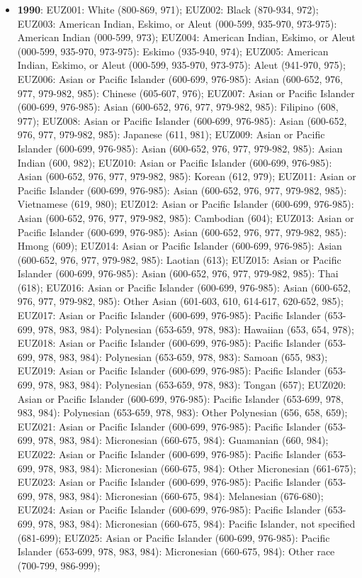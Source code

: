 \documentclass[a4paper]{article}
\begin{document}
\begin{itemize}
   \item{\textbf{1990}:  EUZ001: White (800-869, 971); EUZ002: Black (870-934, 972); EUZ003: American Indian, Eskimo, or Aleut (000-599, 935-970, 973-975): American Indian (000-599, 973); EUZ004: American Indian, Eskimo, or Aleut (000-599, 935-970, 973-975): Eskimo (935-940, 974); EUZ005: American Indian, Eskimo, or Aleut (000-599, 935-970, 973-975): Aleut (941-970, 975); EUZ006: Asian or Pacific Islander (600-699, 976-985): Asian (600-652, 976, 977, 979-982, 985): Chinese (605-607, 976); EUZ007: Asian or Pacific Islander (600-699, 976-985): Asian (600-652, 976, 977, 979-982, 985): Filipino (608, 977); EUZ008: Asian or Pacific Islander (600-699, 976-985): Asian (600-652, 976, 977, 979-982, 985): Japanese (611, 981); EUZ009: Asian or Pacific Islander (600-699, 976-985): Asian (600-652, 976, 977, 979-982, 985): Asian Indian (600, 982); EUZ010: Asian or Pacific Islander (600-699, 976-985): Asian (600-652, 976, 977, 979-982, 985): Korean (612, 979); EUZ011: Asian or Pacific Islander (600-699, 976-985): Asian (600-652, 976, 977, 979-982, 985): Vietnamese (619, 980); EUZ012: Asian or Pacific Islander (600-699, 976-985): Asian (600-652, 976, 977, 979-982, 985): Cambodian (604); EUZ013: Asian or Pacific Islander (600-699, 976-985): Asian (600-652, 976, 977, 979-982, 985): Hmong (609); EUZ014: Asian or Pacific Islander (600-699, 976-985): Asian (600-652, 976, 977, 979-982, 985): Laotian (613); EUZ015: Asian or Pacific Islander (600-699, 976-985): Asian (600-652, 976, 977, 979-982, 985): Thai (618); EUZ016: Asian or Pacific Islander (600-699, 976-985): Asian (600-652, 976, 977, 979-982, 985): Other Asian (601-603, 610, 614-617, 620-652, 985); EUZ017: Asian or Pacific Islander (600-699, 976-985): Pacific Islander (653-699, 978, 983, 984): Polynesian (653-659, 978, 983): Hawaiian (653, 654, 978); EUZ018: Asian or Pacific Islander (600-699, 976-985): Pacific Islander (653-699, 978, 983, 984): Polynesian (653-659, 978, 983): Samoan (655, 983); EUZ019: Asian or Pacific Islander (600-699, 976-985): Pacific Islander (653-699, 978, 983, 984): Polynesian (653-659, 978, 983): Tongan (657); EUZ020: Asian or Pacific Islander (600-699, 976-985): Pacific Islander (653-699, 978, 983, 984): Polynesian (653-659, 978, 983): Other Polynesian (656, 658, 659); EUZ021: Asian or Pacific Islander (600-699, 976-985): Pacific Islander (653-699, 978, 983, 984): Micronesian (660-675, 984): Guamanian (660, 984); EUZ022: Asian or Pacific Islander (600-699, 976-985): Pacific Islander (653-699, 978, 983, 984): Micronesian (660-675, 984): Other Micronesian (661-675); EUZ023: Asian or Pacific Islander (600-699, 976-985): Pacific Islander (653-699, 978, 983, 984): Micronesian (660-675, 984): Melanesian (676-680); EUZ024: Asian or Pacific Islander (600-699, 976-985): Pacific Islander (653-699, 978, 983, 984): Micronesian (660-675, 984): Pacific Islander, not specified (681-699); EUZ025: Asian or Pacific Islander (600-699, 976-985): Pacific Islander (653-699, 978, 983, 984): Micronesian (660-675, 984): Other race (700-799, 986-999);}

\end{itemize}
\end{document}
